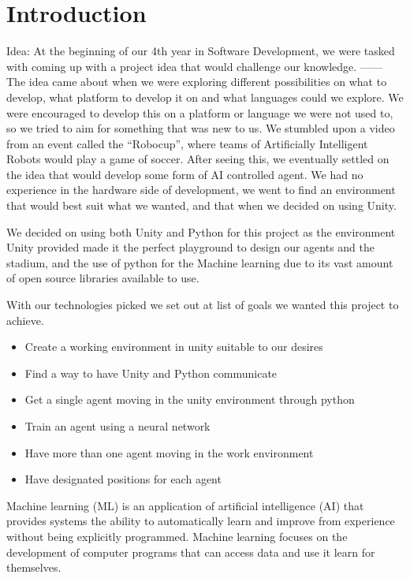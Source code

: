 
\chapter{Introduction}


Idea:
At the beginning of our 4th year in Software Development, we were tasked with coming up with a project idea that would challenge our knowledge. ------
The idea came about when we were exploring different possibilities on what to develop, what platform to develop it on and what languages could we explore. We were encouraged to develop this on a platform or language we were not used to, so we tried to aim for something that was new to us. We stumbled upon a video from an event called the “Robocup”, where teams of Artificially Intelligent Robots would play a game of soccer. After seeing this, we eventually settled on the idea that would develop some form of AI controlled agent. We had no experience in the hardware side of development, we went to find an environment that would best suit what we wanted, and that when we decided on using Unity.


We decided on using both Unity and Python for this project as the environment Unity provided made it the perfect playground to design our agents and the stadium, and the use of python for the Machine learning due to its vast amount of open source libraries available to use.

With our technologies picked we set out at list of goals we wanted this project to achieve. 
\begin{itemize}
  \item Create a working environment in unity suitable to our desires
  \item Find a way to have Unity and Python communicate
  \item Get a single agent moving in the unity environment through python
  \item Train an agent using a neural network
  \item Have more than one agent moving in the work environment
  \item Have designated positions for each agent
\end{itemize}




Machine learning (ML) is an application of artificial intelligence (AI) that provides systems the ability to automatically learn and improve from experience without being explicitly programmed. Machine learning focuses on the development of computer programs that can access data and use it learn for themselves.

